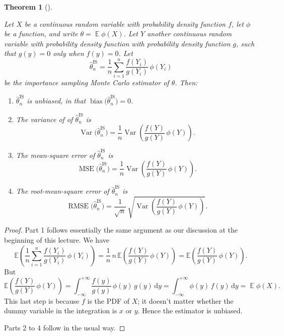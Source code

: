 \documentclass[
  letterpaper,
  DIV=11,
  numbers=noendperiod]{scrreprt}
\newcommand{\Exg}{\operatorname{\mathbb{E}}}
\newcommand{\Ex}{\mathbb{E}}
\theoremstyle{plain}
\newtheorem{theorem}{Theorem}[chapter]
\theoremstyle{definition}
\theoremstyle{definition}
\theoremstyle{remark}
\begin{document}
\begin{theorem}[]\protect\hypertarget{thm-Iserr}{}\label{thm-Iserr}

Let \(X\) be a continuous random variable with probability density
function \(f\), let \(\phi\) be a function, and write
\(\theta = \Exg\phi(X)\). Let \(Y\) another continuous random variable
with probability density function with probability density function
\(g\), such that \(g(y) = 0\) only when \(f(y) = 0\). Let
\[ \widehat{\theta}_n^{\mathrm{IS}} = \frac{1}{n} \sum_{i=1}^n \frac{f(Y_i)}{g(Y_i)}\,\phi(Y_i)  \]
be the importance sampling Monte Carlo estimator of \(\theta\). Then:

\begin{enumerate}
\def\labelenumi{\arabic{enumi}.}
\item
  \(\widehat{\theta}_n^{\mathrm{IS}}\) is unbiased, in that
  \(\operatorname{bias}\big(\widehat{\theta}_n^{\mathrm{IS}}\big) = 0\).
\item
  The variance of of \(\widehat{\theta}_n^{\mathrm{IS}}\) is
  \[ \operatorname{Var}\big(\widehat{\theta}_n^{\mathrm{IS}}\big) = \frac{1}{n} \operatorname{Var}\left( \frac{f(Y)}{g(Y)}\,\phi(Y) \right). \]
\item
  The mean-square error of \(\widehat{\theta}_n^{\mathrm{IS}}\) is
  \[ \operatorname{MSE}\big(\widehat{\theta}_n^{\mathrm{IS}}\big) = \frac{1}{n} \operatorname{Var}\left( \frac{f(Y)}{g(Y)}\,\phi(Y) \right) . \]
\item
  The root-mean-square error of \(\widehat{\theta}_n^{\mathrm{IS}}\) is
  \[ \operatorname{RMSE}\big(\widehat{\theta}_n^{\mathrm{IS}}\big) = \frac{1}{\sqrt{n}} \,\sqrt{\operatorname{Var}\left( \frac{f(Y)}{g(Y)}\,\phi(Y) \right)}. \]
\end{enumerate}

\end{theorem}

\begin{proof}
Part 1 follows essentially the same argument as our discussion at the
beginning of this lecture. We have
\[ \Ex \left( \frac{1}{n} \sum_{i=1}^n \frac{f(Y_i)}{g(Y_i)}\,\phi(Y_i) \right) = \frac{1}{n}\, n\, \Ex \left(\frac{f(Y)}{g(Y)}\,\phi(Y)\right) = \Ex \left(\frac{f(Y)}{g(Y)}\,\phi(Y)\right) . \]
But
\[ \Ex \left(\frac{f(Y)}{g(Y)}\,\phi(Y)\right) = \int_{-\infty}^{+\infty} \frac{f(y)}{g(y)}\,\phi(y)\,g(y)\,\mathrm{d}y = \int_{-\infty}^{+\infty} \phi(y) \, f(y) \, \mathrm{d}y = \Exg \phi(X) . \]
This last step is because \(f\) is the PDF of \(X\); it doesn't matter
whether the dummy variable in the integration is \(x\) or \(y\). Hence
the estimator is unbiased.

Parts 2 to 4 follow in the usual way.
\end{proof}
\end{document}
